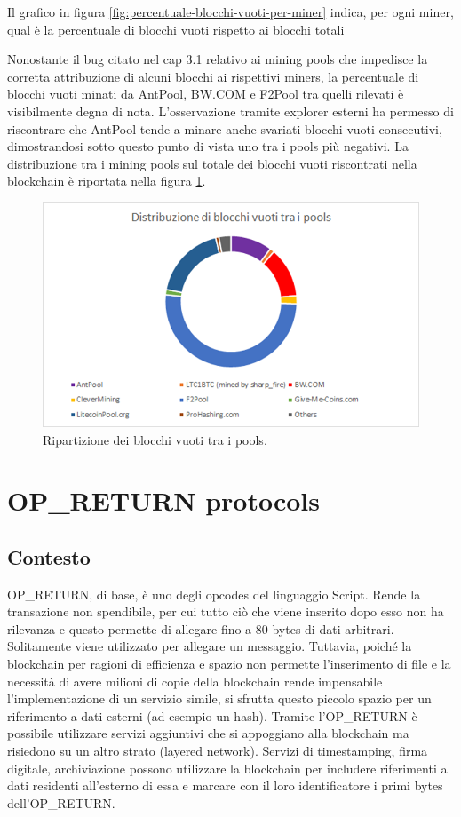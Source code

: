 Il grafico in figura \ref*{fig:percentuale-blocchi-vuoti-per-miner} indica, per ogni miner, qual è la percentuale di blocchi vuoti rispetto ai blocchi totali

Nonostante il bug citato nel cap 3.1 relativo ai mining pools che impedisce la corretta attribuzione di alcuni blocchi ai rispettivi miners, la percentuale di blocchi vuoti minati da AntPool, BW.COM e F2Pool tra quelli rilevati è visibilmente degna di nota. L’osservazione tramite explorer esterni \cite{chainso,litecoinpool} ha permesso di riscontrare che AntPool tende a minare anche svariati blocchi vuoti consecutivi, dimostrandosi sotto questo punto di vista uno tra i pools più negativi.
La distribuzione tra i mining pools sul totale dei blocchi vuoti riscontrati nella blockchain è riportata nella figura \ref{fig:distribuzione-blocchivuoti-ring}.

\begin{figure}[h!]
	\centering
	\includegraphics[width=1.0\linewidth]{images/distribuzione-blocchivuoti-ring}
	\caption{Ripartizione dei blocchi vuoti tra i pools.}
	\label{fig:distribuzione-blocchivuoti-ring}
\end{figure}


\section{OP\_RETURN protocols}
\subsection{Contesto}
OP\_RETURN, di base, è uno degli opcodes del linguaggio Script. Rende la transazione non spendibile, per cui tutto ciò che viene inserito dopo esso non ha rilevanza e questo permette di allegare fino a 80 bytes di dati arbitrari. Solitamente viene utilizzato per allegare un messaggio. Tuttavia, poiché la blockchain per ragioni di efficienza e spazio non permette l’inserimento di file e la necessità di avere milioni di copie della blockchain rende impensabile l’implementazione di un servizio simile, si sfrutta questo piccolo spazio per un riferimento a dati esterni (ad esempio un hash).
Tramite l’OP\_RETURN è possibile utilizzare servizi aggiuntivi che si appoggiano alla blockchain ma risiedono su un altro strato (layered network). Servizi di timestamping, firma digitale, archiviazione possono utilizzare la blockchain per includere riferimenti a dati residenti all’esterno di essa e marcare con il loro identificatore i primi bytes dell’OP\_RETURN.

